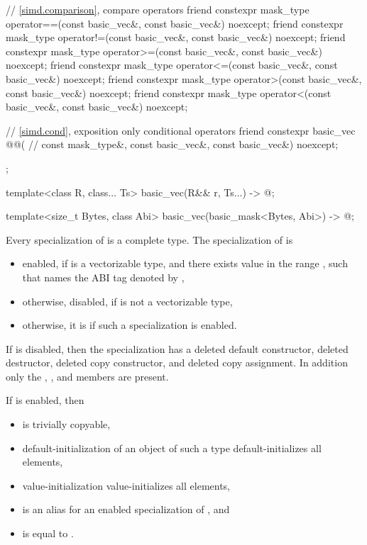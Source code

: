 \begin{codeblock}
{{    // \ref{simd.comparison},  compare operators
    friend constexpr mask_type operator==(const basic_vec&, const basic_vec&) noexcept;
    friend constexpr mask_type operator!=(const basic_vec&, const basic_vec&) noexcept;
    friend constexpr mask_type operator>=(const basic_vec&, const basic_vec&) noexcept;
    friend constexpr mask_type operator<=(const basic_vec&, const basic_vec&) noexcept;
    friend constexpr mask_type operator>(const basic_vec&, const basic_vec&) noexcept;
    friend constexpr mask_type operator<(const basic_vec&, const basic_vec&) noexcept;

    // \ref{simd.cond},  exposition only conditional operators
    friend constexpr basic_vec @@( // \expos
      const mask_type&, const basic_vec&, const basic_vec&) noexcept;
  };

  template<class R, class... Ts>
    basic_vec(R&& r, Ts...) -> @\seebelow@;

  template<size_t Bytes, class Abi>
    basic_vec(basic_mask<Bytes, Abi>) -> @\seebelow@;
}
\end{codeblock}

\pnum
Every specialization of  is a complete type.
The specialization of  is
\begin{itemize}
 \item
    enabled, if  is a vectorizable type, and there exists value
     in the range ,
    such that  names the ABI tag denoted by
    ,
 \item
   otherwise, disabled, if  is not a vectorizable type,
 \item
   otherwise, it is  if such a specialization is enabled.
\end{itemize}

If  is disabled, then the specialization has a
deleted default constructor, deleted destructor, deleted copy constructor, and
deleted copy assignment.
In addition only the , , and
 members are present.

If  is enabled, then
\begin{itemize}
\item
   is trivially copyable,
\item
  default-initialization of an object of such a type
  default-initializes all elements,
\item
  value-initialization value-initializes all elements,
\item
   is an alias
  for an enabled specialization of , and
\item
   is equal to
  .
\end{itemize}

